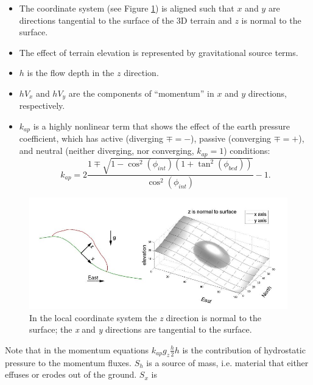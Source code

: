 \documentclass[letterpaper,10pt]{article}
\begin{document}
\begin{itemize}
        \item The coordinate system (see Figure \ref{xzeast}) is aligned such that $x$ and $y$ are directions tangential  
              to the surface of the 3D terrain and $z$ is normal to the surface.
        \item The effect of terrain elevation is represented by gravitational source terms. 
        \item $h$ is the flow depth in the $z$ direction.
        \item $hV_x$ and $hV_y$ are the components of ``momentum'' in $x$ and $y$ directions, respectively.
        \item{ $k_{ap}$ is a highly nonlinear term that shows the effect of the earth pressure coefficient, which has active 
              (diverging $\mp=-$), passive (converging $\mp=+$), and neutral (neither diverging, nor converging, $k_{ap}=1$) conditions:
              \begin{equation}
                        k_{ap}=2\frac{1\mp\sqrt{1-\cos^2(\phi_{int})\left(1+\tan^2(\phi_{bed})\right)}}{\cos^2(\phi_{int})}-1.
                \end{equation}
             }
\end{itemize}
\begin{figure}[!t]
        \begin{center}
                 \includegraphics[height=2.8 truein]{IMAGES/1.jpg}
                \caption{In the local coordinate system the {\itshape z} direction is normal to the surface; 
                the {\itshape x} and {\itshape y} directions are tangential to the surface.}
                \label{xzeast}
        \end{center}
\end{figure}
Note that in the momentum equations $k_{ap}g_z\frac{h}{2}h$ is the contribution of hydrostatic 
pressure to the momentum fluxes. $S_h$ is a source of mass, i.e. 
material that either effuses or erodes out of the ground. $S_x$ is 
\end{document}
